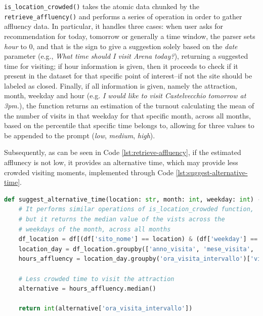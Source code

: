 \texttt{is\_location\_crowded()} takes the atomic data chunked by the \texttt{retrieve\_affluency()} and performs a series of operation in order to gather affluency data. In particular, it handles three cases: when user asks for recommendation for today, tomorrow or generally a time window, the parser sets \textit{hour} to 0, and that is the sign to give a suggestion solely based on the \textit{date} parameter (e.g., \textit{What time should I visit Arena today?}), returning a suggested time for visiting; if hour information is given, then it proceeds to check if it present in the dataset for that specific point of interest--if not the site should be labeled as closed. Finally, if all information is given, namely the attraction, month, weekday and hour (e.g. \textit{I would like to visit Castelvecchio tomorrow at 3pm.}), the function returns an estimation of the turnout calculating the mean of the number of visits in that weekday for that specific month, across all months, based on the percentile that specific time belongs to, allowing for three values to be appended to the prompt (\textit{low}, \textit{medium}, \textit{high}).

Subsequently, as can be seen in Code \ref{lst:retrieve-affluency}, if the estimated afflunecy is not low, it provides an alternative time, which may provide less crowded visiting moments, implemented through Code \ref{lst:suggest-alternative-time}.

\begin{center}
\begin{lstlisting}[language=Python, frame=single, caption=\texttt{suggest\_alternative\_time()} Function.]
def suggest_alternative_time(location: str, month: int, weekday: int) -> str:
    # It performs similar operations of is_location_crowded function,
    # but it returns the median value of the vists across the
    # weekdays of the month, across all months
    df_location = df[(df['sito_nome'] == location) & (df['weekday'] == int(weekday)) & (df['mese_visita'] == int(month))]
    location_day = df_location.groupby(['anno_visita', 'mese_visita', 'weekday', 'ora_visita_intervallo']).size().reset_index(name='visit_count')
    hours_affluency = location_day.groupby('ora_visita_intervallo')['visit_count'].agg(lambda x: x.mean()).reset_index(name='mean_visits')

    # Less crowded time to visit the attraction
    alternative = hours_affluency.median()

    return int(alternative['ora_visita_intervallo'])
\end{lstlisting}
\label{lst:suggest-alternative-time}
\end{center}

